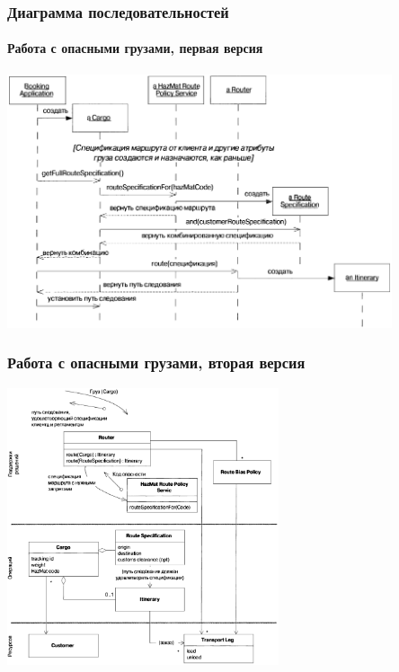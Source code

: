 \documentclass[xetex,mathserif,serif]{beamer}
\begin{document}
	\begin{frame}
		\frametitle{Диаграмма последовательностей}
		\framesubtitle{Работа с опасными грузами, первая версия}
		\begin{center}
			\includegraphics[width=0.85\textwidth]{cargoHazMatWrongSequence.png}
		\end{center}
	\end{frame}

	\begin{frame}
		\frametitle{Работа с опасными грузами, вторая версия}
		\begin{center}
			\includegraphics[width=0.6\textwidth]{cargoHazMatOk.png}
		\end{center}
	\end{frame}
	
\end{document}
